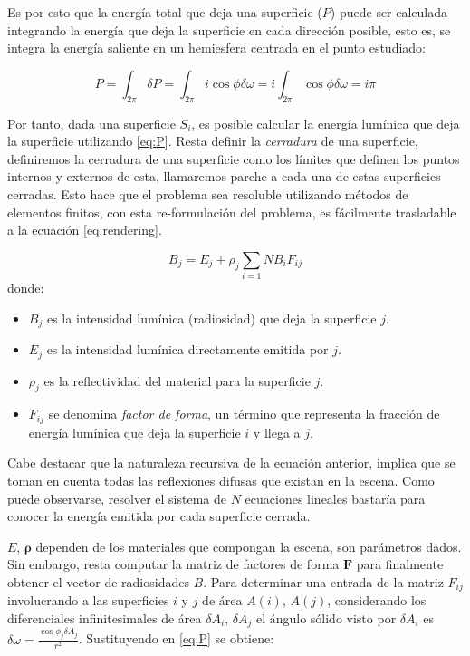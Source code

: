 Es por esto que la energía total que deja una superficie ($P$) puede ser calculada integrando la energía que deja la superficie en cada dirección posible,
esto es, se integra la energía saliente en un hemiesfera centrada en el punto estudiado:

\begin{equation}
    P = \int_{2\pi} \delta{P} = \int_{2\pi} i\cos{\phi}\delta{\omega} = i \int_{2\pi} \cos{\phi}\delta{\omega} = i\pi \label{eq:P}
\end{equation}

Por tanto, dada una superficie $S_{i}$, es posible calcular la energía lumínica que deja la superficie utilizando \eqref{eq:P}.
Resta definir la \textit{cerradura} de una superficie, definiremos la cerradura de una superficie como los límites que definen los puntos internos y externos de esta, llamaremos parche a cada una de estas superficies cerradas. Esto hace que el problema sea resoluble utilizando métodos de elementos finitos, con esta re-formulación 
del problema, es fácilmente trasladable a la ecuación \eqref{eq:rendering}.

\begin{equation}
    B_{j} = E_{j} + \rho_{j} \sum_{i=1}{N} B_{i} F_{ij} \label{eq:radiosity}
\end{equation}
donde:
\begin{itemize}
    \item $B_{j}$ es la intensidad lumínica (radiosidad) que deja la superficie $j$.
    \item $E_{j}$ es la intensidad lumínica directamente emitida por $j$.
    \item $\rho_{j}$ es la reflectividad del material para la superficie $j$.
    \item $F_{ij}$ se denomina \textit{factor de forma}, un término que representa la fracción de energía lumínica
    que deja la superficie $i$ y llega a $j$. 
\end{itemize}

Cabe destacar que la naturaleza recursiva de la ecuación anterior, implica que se toman en cuenta todas las reflexiones 
difusas que existan en la escena. Como puede observarse, resolver el sistema de $N$ ecuaciones lineales 
bastaría para conocer la energía emitida por cada superficie cerrada. 

$E$, $\mathbf{\rho}$ dependen de los materiales que compongan la escena, son parámetros dados. Sin embargo, 
resta computar la matriz de factores de forma $\mathbf{F}$ para finalmente obtener el vector de radiosidades $B$. 
Para determinar una entrada de la matriz $F_{ij}$ involucrando a las superficies $i$ y $j$ de área $A(i)$, $A(j)$,
considerando los diferenciales infinitesimales de área $\delta{A_{i}}$, $\delta{A_{j}}$ el ángulo sólido visto por
$\delta{A_{i}}$ es $\delta{\omega} = \frac{\cos{\phi_{j}\delta{A_{j}}}}{r^{2}}$. Sustituyendo en \eqref{eq:P} se obtiene:

